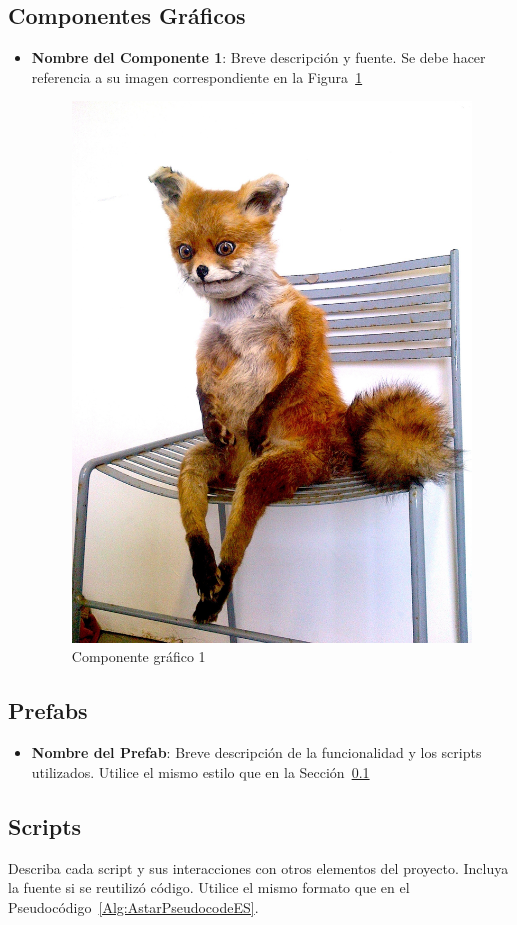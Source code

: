 \documentclass[sjournal]{IEEEtran}
\begin{document}
\subsection{Componentes Gráficos}\label{Sec:CompGraf}
\begin{itemize}
    \item \textbf{Nombre del Componente 1}: Breve descripción y fuente. Se debe hacer referencia a su imagen correspondiente en la Figura~\ref{Fi:componente1}
    \begin{figure}[!ht]\centering
    	\includegraphics[width=0.5\linewidth]{TEC-researcher.jpg}
	\caption{Componente gráfico 1}\label{Fi:componente1}
    \end{figure}
\end{itemize}

\subsection{Prefabs}
\begin{itemize}
    \item \textbf{Nombre del Prefab}: Breve descripción de la funcionalidad y los scripts utilizados. Utilice el mismo estilo que en la Sección~\ref{Sec:CompGraf}
\end{itemize}

\subsection{Scripts}
Describa cada script y sus interacciones con otros elementos del proyecto. Incluya la fuente si se reutilizó código. Utilice el mismo formato que en el Pseudocódigo~\ref{Alg:AstarPseudocodeES}.
\end{document}
